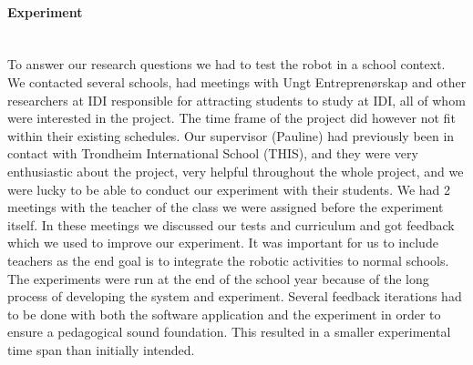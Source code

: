 \paragraph{Experiment}~\\
To answer our research questions we had to test the robot in a school context. We contacted several schools, had meetings with Ungt Entreprenørskap and other researchers at IDI responsible for attracting students to study at IDI, all of whom were interested in the project. The time frame of the project did however not fit within their existing schedules. Our supervisor (Pauline) had previously been in contact with Trondheim International School (THIS), and they were very enthusiastic about the project, very helpful throughout the whole project, and we were lucky to be able to conduct our experiment with their students. 
We had 2 meetings with the teacher of the class we were assigned before the experiment itself. In these meetings we discussed our tests and curriculum and got feedback which we used to improve our experiment. It was important for us to include teachers as the end goal is to integrate the robotic activities to normal schools.
The experiments were run at the end of the school year because of the long process of developing the system and experiment. Several feedback iterations had to be done with both the software application and the experiment in order to ensure a pedagogical sound foundation. This resulted in a smaller experimental time span than initially intended.
